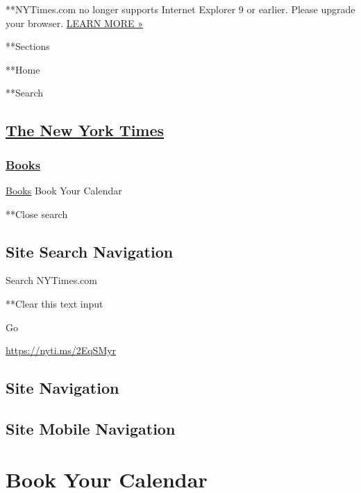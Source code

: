  **NYTimes.com no longer supports Internet Explorer 9 or earlier. Please
upgrade your browser.
\href{http://www.nytimes3xbfgragh.onion/content/help/site/ie9-support.html}{LEARN
MORE »}

**Sections

**Home

**Search

\hypertarget{the-new-york-times}{%
\subsection{\texorpdfstring{\href{http://www.nytimes3xbfgragh.onion/}{The
New York Times}}{The New York Times}}\label{the-new-york-times}}

\hypertarget{-books-}{%
\subsubsection{\texorpdfstring{
\href{https://www.nytimes3xbfgragh.onion/section/books}{Books}
}{ Books }}\label{-books-}}

 \href{https://www.nytimes3xbfgragh.onion/section/books}{Books}
\textbar{}Book Your Calendar

**Close search

\hypertarget{site-search-navigation}{%
\subsection{Site Search Navigation}\label{site-search-navigation}}

Search NYTimes.com

**Clear this text input

Go

\url{https://nyti.ms/2EqSMyr}

\hypertarget{site-navigation}{%
\subsection{Site Navigation}\label{site-navigation}}

\hypertarget{site-mobile-navigation}{%
\subsection{Site Mobile Navigation}\label{site-mobile-navigation}}

\hypertarget{book-your-calendar}{%
\section{Book Your Calendar}\label{book-your-calendar}}

